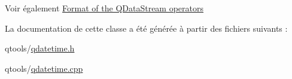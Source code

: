 \begin{DoxySeeAlso}{Voir également}
\hyperlink{}{Format of the Q\+Data\+Stream operators } 
\end{DoxySeeAlso}


La documentation de cette classe a été générée à partir des fichiers suivants \+:\begin{DoxyCompactItemize}
\item 
qtools/\hyperlink{qdatetime_8h}{qdatetime.\+h}\item 
qtools/\hyperlink{qdatetime_8cpp}{qdatetime.\+cpp}\end{DoxyCompactItemize}
